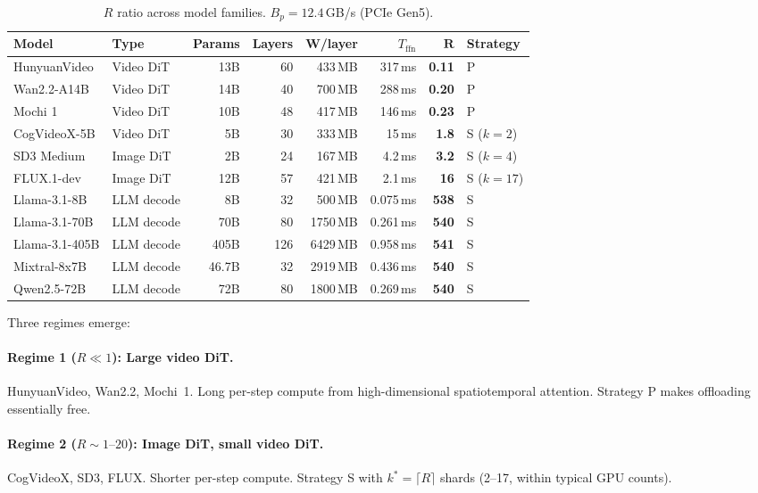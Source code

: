 \documentclass{article}
\begin{document}
\begin{table}[h]
\centering
\caption{$R$ ratio across model families. $B_p = 12.4$\,GB/s (PCIe Gen5).}
\label{tab:rratio}
\small
\begin{tabular}{@{}llrrrrrl@{}}
\toprule
\textbf{Model} & \textbf{Type} & \textbf{Params} & \textbf{Layers} & \textbf{W/layer} & $T_{\text{ffn}}$ & $\boldsymbol{R}$ & \textbf{Strategy} \\
\midrule
HunyuanVideo    & Video DiT & 13B  & 60  & 433\,MB & 317\,ms   & \textbf{0.11} & P \\
Wan2.2-A14B     & Video DiT & 14B  & 40  & 700\,MB & 288\,ms   & \textbf{0.20} & P \\
Mochi 1         & Video DiT & 10B  & 48  & 417\,MB & 146\,ms   & \textbf{0.23} & P \\
\midrule
CogVideoX-5B   & Video DiT & 5B   & 30  & 333\,MB & 15\,ms    & \textbf{1.8}  & S ($k{=}2$) \\
SD3 Medium      & Image DiT & 2B   & 24  & 167\,MB & 4.2\,ms   & \textbf{3.2}  & S ($k{=}4$) \\
FLUX.1-dev      & Image DiT & 12B  & 57  & 421\,MB & 2.1\,ms   & \textbf{16}   & S ($k{=}17$) \\
\midrule
Llama-3.1-8B    & LLM decode  & 8B   & 32  & 500\,MB   & 0.075\,ms & \textbf{538} & S \\
Llama-3.1-70B   & LLM decode  & 70B  & 80  & 1750\,MB  & 0.261\,ms & \textbf{540} & S \\
Llama-3.1-405B  & LLM decode  & 405B & 126 & 6429\,MB  & 0.958\,ms & \textbf{541} & S \\
Mixtral-8x7B    & LLM decode  & 46.7B & 32 & 2919\,MB  & 0.436\,ms & \textbf{540} & S \\
Qwen2.5-72B     & LLM decode  & 72B  & 80  & 1800\,MB  & 0.269\,ms & \textbf{540} & S \\
\bottomrule
\end{tabular}
\end{table}

Three regimes emerge:

\paragraph{Regime 1 ($R \ll 1$): Large video DiT.} HunyuanVideo, Wan2.2, Mochi~1. Long per-step compute from high-dimensional spatiotemporal attention. Strategy P makes offloading essentially free.

\paragraph{Regime 2 ($R \sim 1\text{--}20$): Image DiT, small video DiT.} CogVideoX, SD3, FLUX. Shorter per-step compute. Strategy S with $k^* = \lceil R \rceil$ shards (2--17, within typical GPU counts).
\end{document}
